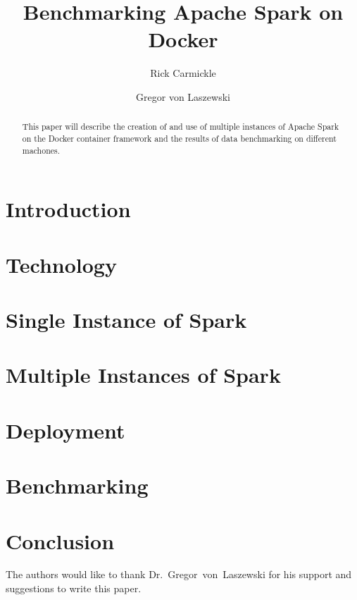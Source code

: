 
\title{Benchmarking Apache Spark on Docker}


\author{Rick Carmickle}

\author{Gregor von Laszewski}


\renewcommand{\shortauthors}{G. v. Laszewski}


\begin{abstract}
This paper will describe the creation of and use of multiple instances of Apache Spark
on the Docker container framework and the results of data benchmarking on different machones. 
\end{abstract}



\maketitle




\section{Introduction}


\section{Technology}


\section{Single Instance of Spark}


\section{Multiple Instances of Spark}


\section{Deployment}


\section{Benchmarking}


\section{Conclusion}



\begin{acks}

  The authors would like to thank Dr.~Gregor~von~Laszewski for his
  support and suggestions to write this paper.

\end{acks}


 

